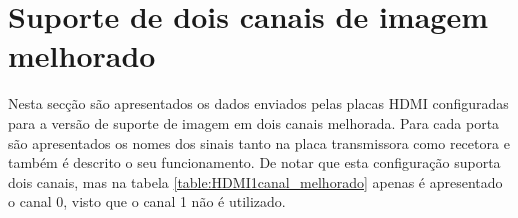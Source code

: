 
\section{Suporte de dois canais de imagem melhorado} \label{ap1:HDMIconfigMelhorado}

Nesta secção são apresentados os dados enviados pelas placas HDMI configuradas para a versão de suporte de imagem em dois canais melhorada. Para cada porta são apresentados os nomes dos sinais tanto na placa transmissora como recetora e também é descrito o seu funcionamento. De notar que esta configuração suporta dois canais, mas na tabela \ref{table:HDMI1canal_melhorado} apenas é apresentado o canal 0, visto que o canal 1 não é utilizado.
\\


